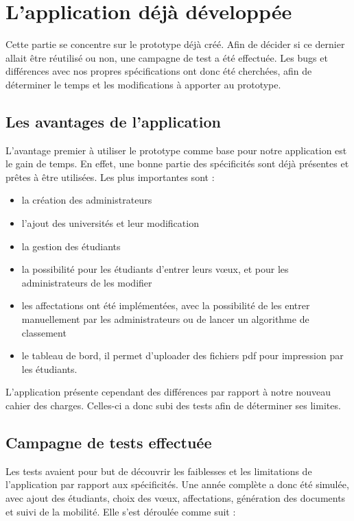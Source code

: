 \section{L'application déjà développée}

Cette partie se concentre sur le prototype déjà créé. Afin de décider si ce dernier allait être réutilisé ou non, une campagne de test a été effectuée. Les bugs et différences avec nos propres spécifications ont donc été cherchées, afin de déterminer le temps et les modifications à apporter au prototype.


\subsection{Les avantages de l'application}

L'avantage premier à utiliser le prototype comme base pour notre application est le gain de temps. En effet, une bonne partie des spécificités sont déjà présentes et prêtes à être utilisées.
Les plus importantes sont :
\begin{itemize}
\item la création des administrateurs
\item l'ajout des universités et leur modification
\item la gestion des étudiants
\item la possibilité pour les étudiants d'entrer leurs vœux, et pour les administrateurs de les modifier
\item les affectations ont été implémentées, avec la possibilité de les entrer manuellement par les administrateurs ou de lancer un algorithme de classement
\item le tableau de bord, il permet d'uploader des fichiers pdf pour impression par les étudiants.
\end{itemize}

L'application présente cependant des différences par rapport à notre nouveau cahier des charges. Celles-ci a donc subi des tests afin de déterminer ses limites.


\subsection{Campagne de tests effectuée}

Les tests avaient pour but de découvrir les faiblesses et les limitations de l'application par rapport aux spécificités. Une année complète a donc été simulée, avec ajout des étudiants, choix des vœux, affectations, génération des documents et suivi de la mobilité.
Elle s'est déroulée comme suit :

